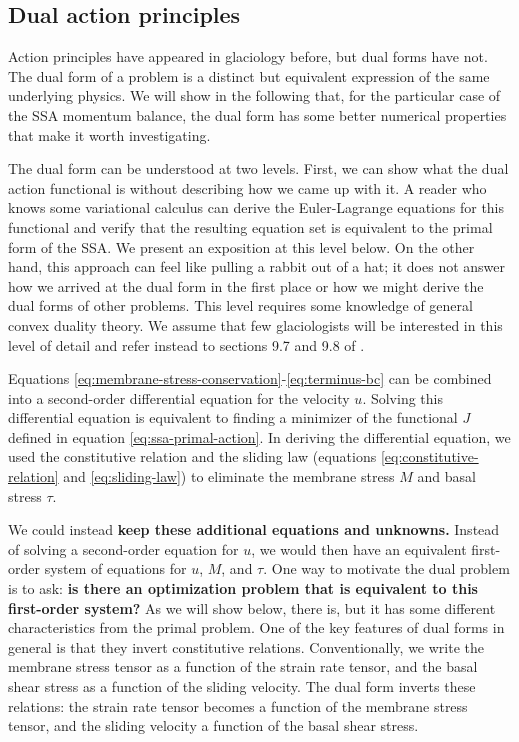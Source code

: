 \documentclass[review,oneside]{igs}
\begin{document}
\subsection{Dual action principles}
\label{subsec:dual-action-principles}

Action principles have appeared in glaciology before, but dual forms have not.
The dual form of a problem is a distinct but equivalent expression of the same underlying physics.
We will show in the following that, for the particular case of the SSA momentum balance, the dual form has some better numerical properties that make it worth investigating.

The dual form can be understood at two levels.
First, we can show what the dual action functional is without describing how we came up with it.
A reader who knows some variational calculus can derive the Euler-Lagrange equations for this functional and verify that the resulting equation set is equivalent to the primal form of the SSA.
We present an exposition at this level below.
On the other hand, this approach can feel like pulling a rabbit out of a hat; it does not answer how we arrived at the dual form in the first place or how we might derive the dual forms of other problems.
This level requires some knowledge of general convex duality theory.
We assume that few glaciologists will be interested in this level of detail and refer instead to sections 9.7 and 9.8 of \citet{attouch2014variational}.

Equations \eqref{eq:membrane-stress-conservation}-\eqref{eq:terminus-bc} can be combined into a second-order differential equation for the velocity $u$.
Solving this differential equation is equivalent to finding a minimizer of the functional $J$ defined in equation \eqref{eq:ssa-primal-action}.
In deriving the differential equation, we used the constitutive relation and the sliding law (equations \eqref{eq:constitutive-relation} and \eqref{eq:sliding-law}) to eliminate the membrane stress $M$ and basal stress $\tau$.

We could instead \textbf{keep these additional equations and unknowns.}
Instead of solving a second-order equation for $u$, we would then have an equivalent first-order system of equations for $u$, $M$, and $\tau$.
One way to motivate the dual problem is to ask: \textbf{is there an optimization problem that is equivalent to this first-order system?}
As we will show below, there is, but it has some different characteristics from the primal problem.
One of the key features of dual forms in general is that they invert constitutive relations.
Conventionally, we write the membrane stress tensor as a function of the strain rate tensor, and the basal shear stress as a function of the sliding velocity.
The dual form inverts these relations: the strain rate tensor becomes a function of the membrane stress tensor, and the sliding velocity a function of the basal shear stress.
\end{document}
